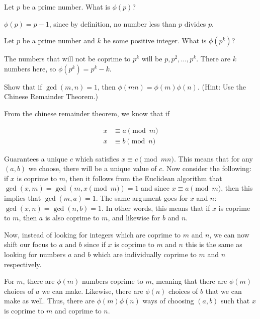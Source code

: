 \documentclass[11pt]{article}
\begin{document}
  \begin{Parts}
    \Part Let $p$ be a prime number. What is $\phi(p)$?

    \begin{solution}
      $\phi(p) = p-1$, since by definition, no number less than $p$ divides $p$.
    \end{solution}

    \Part Let $p$ be a prime number and $k$ be some positive integer. What is $\phi(p^k)$?

    \begin{solution}
        The numbers that will not be coprime to $p^k$ will be $p, p^2, \dots, p^{k}$. There are $k$ numbers here, so $\phi(p^k) = p^k-k$.
      \end{solution}

    \Part Show that if $\gcd(m, n) = 1$, then $\phi(mn) = \phi(m)\phi(n)$. (Hint: Use the Chinese Remainder Theorem.)

    \begin{solution}
      From the chinese remainder theorem, we know that if 

      \begin{align*}
        x &\equiv a \pmod{m}\\
        x &\equiv b \pmod{n} 
      \end{align*}

      Guarantees a unique $c$ which satisfies $x \equiv c \pmod{mn}$. This means that for any $(a, b)$ we choose, there will be a unique value of $c$. Now consider the following: if $x$ is coprime to $m$, then it follows from the Euclidean algorithm that $\gcd(x, m) = \gcd(m, x \pmod m) = 1$ and since $x \equiv a \pmod m$, then this implies that $\gcd(m, a) = 1$. The same argument goes for $x$ and $n$: $\gcd(x, n) = \gcd(n, b) = 1$. In other words, this means that if $x$ is coprime to $m$, then $a$ is also coprime to $m$, and likewise for $b$ and $n$. 

      Now, instead of looking for integers which are coprime to $m$ and $n$, we can now shift our focus to $a$ and $b$ since if $x$ is coprime to $m$ and $n$ this is the same as looking for numbers $a$ and $b$ which are individually coprime to $m$ and $n$ respectively. 

      For $m$, there are $\phi(m)$ numbers coprime to $m$, meaning that there are $\phi(m)$ choices of $a$ we can make. Likewise, there are $\phi(n)$ choices of $b$ that we can make as well. Thus, there are $\phi(m)\phi(n)$ ways of choosing $(a, b)$ such that $x$ is coprime to $m$ and coprime to $n$. 
      

\end{solution}
\end{Parts}
\end{document}
